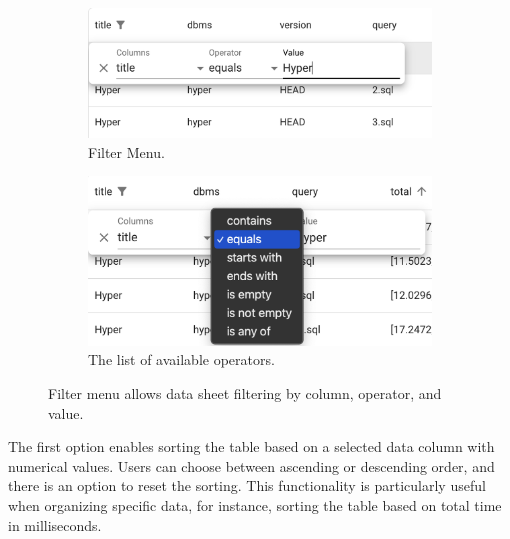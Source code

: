 \begin{figure}[h]
  \centering
  \begin{subfigure}[b]{0.4\linewidth}
      \includegraphics[width=\linewidth]{figures/data-viewer-filter.png}
      \caption{Filter Menu.}
      \label{fig:data-viewer-filter}
  \end{subfigure}
  \hspace{1cm} %
  \begin{subfigure}[b]{0.4\linewidth}
      \includegraphics[width=\linewidth]{figures/data-viewer-filter-operator.png}
      \caption{The list of available operators.}
      \label{fig:data-viewer-filter-operator}
  \end{subfigure}
  \caption{Filter menu allows data sheet filtering by column, operator, and value.}
  \label{fig:combined-figures}
\end{figure}

The first option enables sorting the table based on a selected data column with numerical values. Users can choose between ascending or descending order, and there is an option to reset the sorting. This functionality is particularly useful when organizing specific data, for instance, sorting the table based on total time in milliseconds.

